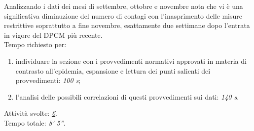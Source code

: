 Analizzando i dati dei mesi di settembre, ottobre e novembre nota che vi è una significativa diminuzione del numero di contagi con l'inasprimento delle misure restrittive soprattutto a fine novembre, esattamente due settimane dopo l'entrata in vigore del DPCM più recente.\\
Tempo richiesto per:
\begin{enumerate}
    \item individuare la sezione con i provvedimenti normativi approvati in materia di contrasto all'epidemia, espansione e lettura dei punti salienti dei provvedimenti: \textit{100 s};
    \item l'analisi delle possibili correlazioni di questi provvedimenti sui dati: \textit{140 s}.
\end{enumerate}\noindent

Attività svolte: \hyperref[itm:6]{\textit{6}}.\\ 
Tempo totale: \textit{8' 5''}. 
